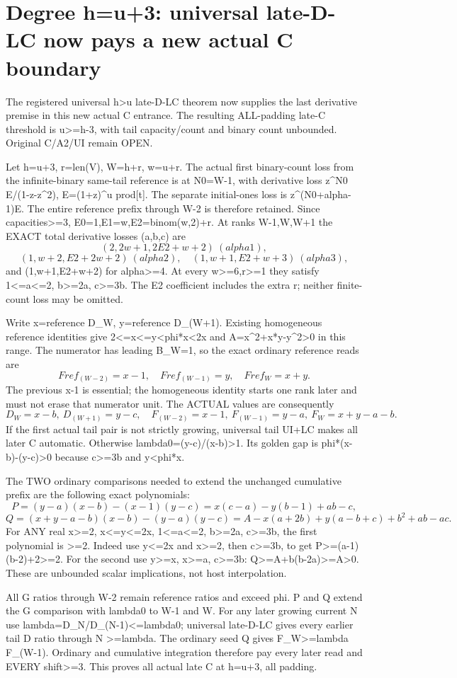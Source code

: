 \section{Degree h=u+3: universal late-D-LC now pays a new actual C boundary}
The registered universal h>u late-D-LC theorem now supplies the
last derivative premise in this new actual C entrance. The resulting
ALL-padding late-C threshold is u>=h-3, with tail capacity/count and
binary count unbounded. Original C/A2/UI remain OPEN.

Let h=u+3, r=len(V), W=h+r, w=u+r. The actual first binary-count
loss from the infinite-binary same-tail reference is at N0=W-1,
with derivative loss z^N0 E/(1-z-z^2), E=(1+z)^u prod[t].
The separate initial-ones loss is z^(N0+alpha-1)E.
The entire reference prefix through W-2 is therefore retained.
Since capacities>=3, E0=1,E1=w,E2=binom(w,2)+r.
At ranks W-1,W,W+1 the EXACT total derivative losses (a,b,c) are
\[
 (2,2w+1,2E2+w+2)\ (alpha1),
\]
\[
 (1,w+2,E2+2w+2)\ (alpha2),\quad
 (1,w+1,E2+w+3)\ (alpha3),
\]
and (1,w+1,E2+w+2) for alpha>=4. At every w>=6,r>=1 they satisfy
1<=a<=2, b>=2a, c>=3b. The E2 coefficient includes the extra r;
neither finite-count loss may be omitted.

Write x=reference D_W, y=reference D_(W+1). Existing homogeneous
reference identities give 2<=x<=y<phi*x<2x and
A=x^2+x*y-y^2>0 in this range. The numerator has leading B_W=1,
so the exact ordinary reference reads are
\[
 Fref_(W-2)=x-1,\quad Fref_(W-1)=y,\quad Fref_W=x+y.
\]
The previous x-1 is essential; the homogeneous identity starts one
rank later and must not erase that numerator unit.
The ACTUAL values are consequently
\[
 D_W=x-b,\ D_(W+1)=y-c,\quad
 F_(W-2)=x-1,\ F_(W-1)=y-a,\ F_W=x+y-a-b.
\]
If the first actual tail pair is not strictly growing, universal
tail UI+LC makes all later C automatic. Otherwise lambda0=(y-c)/(x-b)>1.
Its golden gap is
phi*(x-b)-(y-c)>0 because c>=3b and y<phi*x.

The TWO ordinary comparisons needed to extend the unchanged cumulative
prefix are the following exact polynomials:
\[
 P=(y-a)(x-b)-(x-1)(y-c)
   =x(c-a)-y(b-1)+ab-c,
\]
\[
 Q=(x+y-a-b)(x-b)-(y-a)(y-c)
   =A-x(a+2b)+y(a-b+c)+b^2+ab-ac.
\]
For ANY real x>=2, x<=y<=2x, 1<=a<=2, b>=2a, c>=3b,
the first polynomial is >=2. Indeed use y<=2x and x>=2,
then c>=3b, to get P>=(a-1)(b-2)+2>=2.
For the second use y>=x, x>=a, c>=3b:
Q>=A+b(b-2a)>=A>0.
These are unbounded scalar implications, not host interpolation.

All G ratios through W-2 remain reference ratios and exceed phi.
P and Q extend the G comparison with lambda0 to W-1 and W.
For any later growing current N use lambda=D_N/D_(N-1)<=lambda0;
universal late-D-LC gives every earlier tail D ratio through N >=lambda.
The ordinary seed Q gives F_W>=lambda F_(W-1). Ordinary and cumulative
integration therefore pay every later read and EVERY shift>=3.
This proves all actual late C at h=u+3, all padding.

